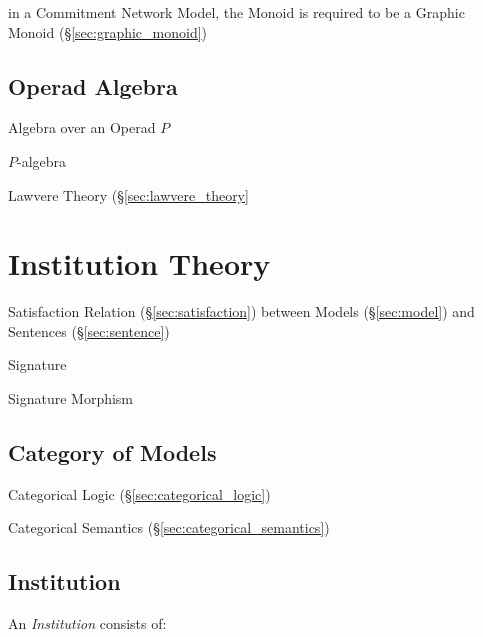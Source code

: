 in a Commitment Network Model, the Monoid is required to be a Graphic Monoid
(\S\ref{sec:graphic_monoid})



\subsection{Operad Algebra}\label{sec:operad_algebra}

Algebra over an Operad $P$

$P$-algebra

Lawvere Theory (\S\ref{sec:lawvere_theory}



\section{Institution Theory}\label{sec:institution_theory}

Satisfaction Relation (\S\ref{sec:satisfaction}) between Models
(\S\ref{sec:model}) and Sentences (\S\ref{sec:sentence})

Signature

Signature Morphism



\subsection{Category of Models}\label{sec:category_of_models}

Categorical Logic (\S\ref{sec:categorical_logic})

Categorical Semantics (\S\ref{sec:categorical_semantics})



\subsection{Institution}\label{sec:institution}

An \emph{Institution} consists of:

